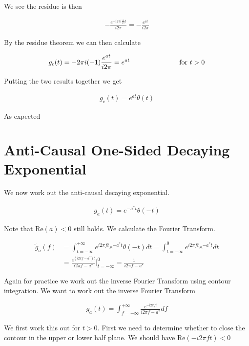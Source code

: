 \documentclass[12pt]{article}
\begin{document}
We see the residue is then

\begin{align}
- \frac{e^{-i 2 \pi i \frac{a}{2\pi} t}}{i2\pi} = -\frac{e^{at}}{i2\pi}
\end{align}

By the residue theorem we can then calculate

\begin{align}
g_c(t) = -2\pi i (-1)\frac{e^{at}}{i2\pi} = e^{at} \hspace{1 in} \text{for } t>0
\end{align}

Putting the two results together we get

\begin{align}
g_c(t) = e^{at} \theta(t)
\end{align}

As expected

\section{Anti-Causal One-Sided Decaying Exponential}

We now work out the anti-causal decaying exponential.

\begin{align}
g_a(t) = e^{-a^* t} \theta(-t)
\end{align}

Note that $\text{Re}(a)<0$ still holds.
We calculate the Fourier Transform.

\begin{align}
\tilde{g}_a
(f) &= \int_{t=-\infty}^{+\infty} e^{i 2\pi f t} e^{-a^*t} \theta(-t) dt = \int_{t=-\infty}^{0} e^{i 2\pi f t} e^{-a^*t} dt\\
&= \frac{e^{\left(i 2 \pi f  - a^*\right)t}}{i 2 \pi f - a^*}\Bigg \rvert_{t=-\infty}^0 = \frac{1}{i 2\pi f - a^*}
\end{align}

Again for practice we work out the inverse Fourier Transform using contour integration. We want to work out the inverse Fourier Transform

\begin{align}
g_a(t) = \int_{f=-\infty}^{+\infty} \frac{e^{-i 2\pi f t}}{i 2\pi f - a^*} df
\end{align}

We first work this out for $t>0$. First we need to determine whether to close the contour in the upper or lower half plane. We should have $\text{Re}(-i2 \pi f t) < 0$
\end{document}
